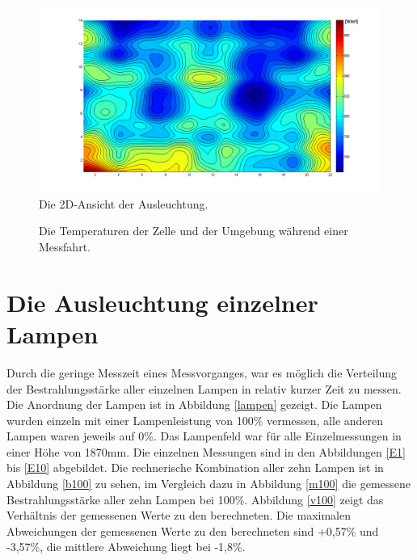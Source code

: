 \documentclass[a4paper,bibtotoc,oneside]{scrbook}
\begin{document}
\begin{figure}[htbp]
\centering
\includegraphics[width=125mm]{img/g2d.png}
\caption{Die 2D-Ansicht der Ausleuchtung.}\label{g2d}
\end{figure}

\begin{figure} [htbp]
\caption{Die Temperaturen der Zelle und der Umgebung während einer Messfahrt.}
\label{t}
\end{figure} 

\FloatBarrier


\section{Die Ausleuchtung einzelner Lampen}

Durch die geringe Messzeit eines Messvorganges, war es möglich die Verteilung der Bestrahlungsstärke aller einzelnen Lampen in relativ kurzer Zeit zu messen. Die Anordnung der Lampen ist in Abbildung \ref{lampen} gezeigt. Die Lampen wurden einzeln mit einer Lampenleistung von 100\% vermessen, alle anderen Lampen waren jeweils auf 0\%. Das Lampenfeld war für alle Einzelmessungen in einer Höhe von 1870mm.
Die einzelnen Messungen sind in den Abbildungen \ref{E1} bis \ref{E10} abgebildet.
Die rechnerische Kombination aller zehn Lampen ist in Abbildung \ref{b100} zu sehen, im Vergleich dazu in Abbildung \ref{m100} die gemessene Bestrahlungsstärke aller zehn Lampen bei 100\%.
Abbildung \ref{v100} zeigt das Verhältnis der gemessenen Werte zu den berechneten. Die maximalen Abweichungen der gemessenen Werte zu den berechneten sind +0,57\% und -3,57\%, die mittlere Abweichung liegt bei -1,8\%. 
\end{document}
